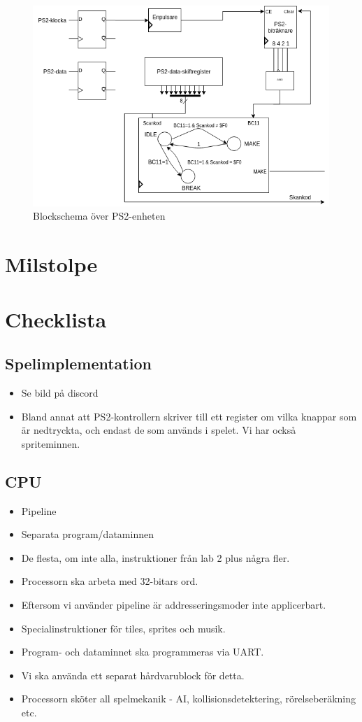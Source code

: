 \documentclass[a4paper,titlepage]{article}
\begin{document}
\begin{figure}[h!]
	\centering
\includegraphics[width=12cm]{PS2.png}
	\caption{Blockschema över PS2-enheten}
\end{figure}

\newpage
\section{Milstolpe}
 
\newpage
\section{Checklista}
    \subsection{Spelimplementation}
        \begin{itemize}
            \item Se bild på discord
            \item Bland annat att PS2-kontrollern skriver till ett register om
                vilka knappar som är nedtryckta, och endast de som används i
                spelet. Vi har också spriteminnen.
        \end{itemize}
    \subsection{CPU}
        \begin{itemize}
            \item Pipeline
            \item Separata program/dataminnen
            \item De flesta, om inte alla, instruktioner från lab 2 plus några
				fler.
            \item Processorn ska arbeta med 32-bitars ord.
            \item Eftersom vi använder pipeline är addresseringsmoder inte applicerbart.
            \item Specialinstruktioner för tiles, sprites och musik.
            \item Program- och dataminnet ska programmeras via UART.
            \item Vi ska använda ett separat hårdvarublock för detta.
            \item Processorn sköter all spelmekanik - AI,
				kollisionsdetektering, rörelseberäkning etc.
        \end{itemize}
\end{document}
